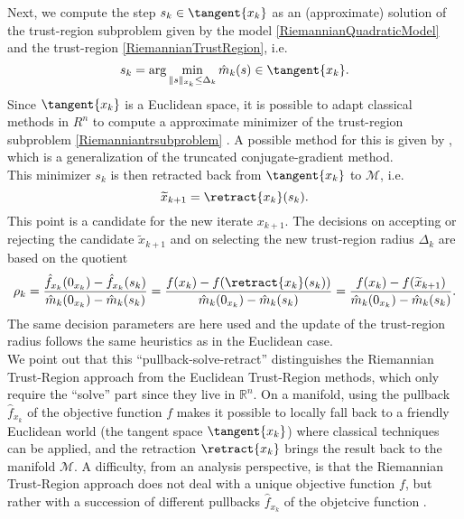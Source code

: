 Next, we compute the step $s_k \in \tangent{x_k}$ as an (approximate) solution of the trust-region subproblem given by the model \cref{RiemannianQuadraticModel} and the trust-region \cref{RiemannianTrustRegion}, i.e.
\begin{equation}\label{Riemanniantrsubproblem}
    s_k = \arg \min_{\lVert s \rVert_{x_k} \leq \Delta_k} \hat{m}_k( s ) \in \tangent{x_k}.
\end{equation}
Since $\tangent{x_k}$ is a Euclidean space, it is possible to adapt classical methods in $R^n$ to compute a approximate minimizer of the trust-region subproblem \cref{Riemanniantrsubproblem} \cite[p.~304]{AbsilBakerGallivan:2007}. A possible method for this is given by \cite[Algorithm~11]{AbsilMahonySepulchre:2008}, which is a generalization of the truncated conjugate-gradient method. \\
This minimizer $s_k$ is then retracted back from $\tangent{x_k}$ to $\mathcal{M}$, i.e.
\begin{equation*}
    \widetilde{x}_{k+1} = \retract{x_k}(s_k).
\end{equation*}
This point is a candidate for the new iterate $x_{k+1}$. The decisions on accepting or rejecting the candidate $\widetilde{x}_{k+1}$ and on selecting the new trust-region radius $\Delta_k$ are based on the quotient
\begin{equation*}
    \rho_k = \frac{\hat{f}_{x_k}(0_{x_k}) - \hat{f}_{x_k}(s_k)}{\hat{m}_k(0_{x_k}) - \hat{m}_k(s_k)} = \frac{f(x_k) - f(\retract{x_k}(s_k))}{\hat{m}_k(0_{x_k}) - \hat{m}_k(s_k)} = \frac{f(x_k) - f(\widetilde{x}_{k+1})}{\hat{m}_k(0_{x_k}) - \hat{m}_k(s_k)}.
\end{equation*}
The same decision parameters are here used and the update of the trust-region radius follows the same heuristics as in the Euclidean case. \\ 
We point out that this “pullback-solve-retract” distinguishes the Riemannian Trust-Region approach from the Euclidean Trust-Region methods, which only require the “solve” part since they live in $\mathbb{R}^n$. On a manifold, using the pullback $\hat{f}_{x_k}$ of the objective function $f$ makes it possible to locally fall back to a friendly Euclidean world (the tangent space $\tangent{x_k}$) where classical techniques can be applied, and the retraction $\retract{x_k}$ brings the result back to the manifold $\mathcal{M}$. A difficulty, from an analysis perspective, is that the Riemannian Trust-Region approach does not deal with a unique objective function $f$,
but rather with a succession of different pullbacks $\hat{f}_{x_k}$ of the objetcive function \cite[p.~305]{AbsilBakerGallivan:2007}. \\

